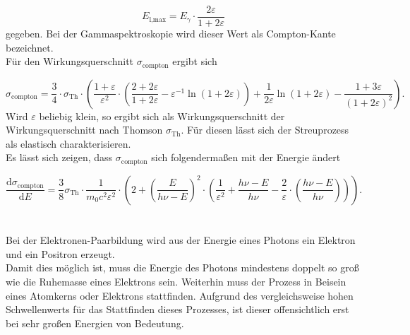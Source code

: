 \begin{equation}
  \label{eqn:ckante}
  E_\text{l,max} = E_\gamma \cdot \frac{2\varepsilon}{1 + 2\varepsilon}
\end{equation}
gegeben. Bei der Gammaspektroskopie wird dieser Wert als Compton-Kante bezeichnet.\\
Für den Wirkungsquerschnitt $\sigma_\text{compton}$ ergibt sich

\begin{equation}
  \label{eqn:comptonquerschnitt}
  \sigma_\text{compton} = \frac{3}{4} \cdot \sigma_\text{Th}
  \cdot \left( \frac{1 + \varepsilon}{\varepsilon^2}
  \cdot \left( \frac{2 + 2\varepsilon}{1 + 2\varepsilon} - \varepsilon^{-1} \ln\left( 1 + 2\varepsilon \right) \right)
  + \frac{1}{2\varepsilon} \ln\left( 1 + 2\varepsilon \right) - \frac{1 + 3\varepsilon}{(1 + 2\varepsilon)^2}  \right) .
\end{equation}
Wird $\varepsilon$ beliebig klein, so ergibt sich als Wirkungsquerschnitt der Wirkungsquerschnitt nach Thomson
$\sigma_\text{Th}$. Für diesen lässt sich der Streuprozess als elastisch charakterisieren.\\
Es lässt sich zeigen, dass $\sigma_\text{compton}$ sich folgendermaßen mit der Energie ändert

\begin{equation}
  \label{eqn:dsig}
  \frac{\mathrm{d}\sigma_\text{compton}}{\mathrm{d}E} = \frac{3}{8} \sigma_\text{Th}
  \cdot \frac{1}{m_{0} c^2 \varepsilon^2} \cdot \left(  2 + \left( \frac{E}{h\nu - E} \right)^2
  \cdot \left( \frac{1}{\varepsilon^2} + \frac{h\nu - E}{h\nu} - \frac{2}{\varepsilon}
  \cdot \left( \frac{h\nu - E}{h\nu} \right) \right) \right) .
\end{equation}
\\ \\
Bei der Elektronen-Paarbildung wird aus der Energie eines Photons ein Elektron und ein Positron erzeugt.\\
Damit dies möglich ist, muss die Energie des Photons mindestens doppelt so groß wie die Ruhemasse eines Elektrons
sein. Weiterhin muss der Prozess in Beisein eines Atomkerns oder Elektrons stattfinden. Aufgrund des vergleichsweise
hohen Schwellenwerts für das Stattfinden dieses Prozesses, ist dieser offensichtlich erst bei sehr großen Energien
von Bedeutung.

